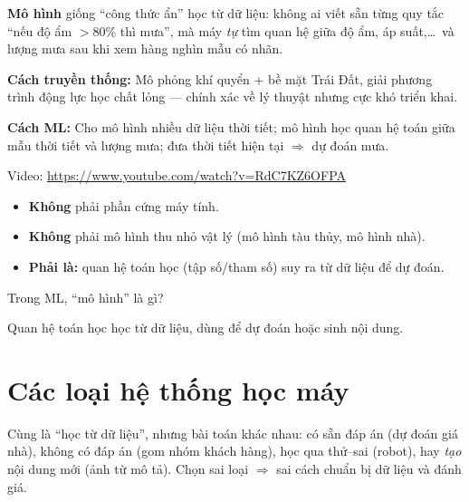 \documentclass[12pt,a4paper]{article}
\begin{document}
\begin{ynghia}
\textbf{Mô hình} giống ``công thức ẩn'' học từ dữ liệu: không ai viết sẵn từng quy tắc ``nếu độ ẩm $> 80\%$ thì mưa'', mà máy \emph{tự} tìm quan hệ giữa độ ẩm, áp suất,\ldots\ và lượng mưa sau khi xem hàng nghìn mẫu có nhãn.
\end{ynghia}

\begin{phuongphap}[title={Hai cách giải bài toán dự báo mưa}]
\textbf{Cách truyền thống:} Mô phỏng khí quyển + bề mặt Trái Đất, giải phương trình động lực học chất lỏng --- chính xác về lý thuyật nhưng cực khó triển khai.

\textbf{Cách ML:} Cho mô hình nhiều dữ liệu thời tiết; mô hình học quan hệ toán giữa mẫu thời tiết và lượng mưa; đưa thời tiết hiện tại $\Rightarrow$ dự đoán mưa.

\medskip
Video: \url{https://www.youtube.com/watch?v=RdC7KZ6OFPA}
\end{phuongphap}

\begin{phanvidu}[title={``Mô hình''}]
\begin{itemize}
  \item \textbf{Không} phải phần cứng máy tính.
  \item \textbf{Không} phải mô hình thu nhỏ vật lý (mô hình tàu thủy, mô hình nhà).
  \item \textbf{Phải là:} quan hệ toán học (tập số/tham số) suy ra từ dữ liệu để dự đoán.
\end{itemize}
\end{phanvidu}

\begin{luuy}
Trong ML, ``mô hình'' là gì?

\medskip
Quan hệ toán học học từ dữ liệu, dùng để dự đoán hoặc sinh nội dung.
\end{luuy}

\section{Các loại hệ thống học máy}

\begin{dongco}[title={Cần phân loại hệ thống ML}]
Cùng là ``học từ dữ liệu'', nhưng bài toán khác nhau: có sẵn đáp án (dự đoán giá nhà), không có đáp án (gom nhóm khách hàng), học qua thử--sai (robot), hay \emph{tạo} nội dung mới (ảnh từ mô tả). Chọn sai loại $\Rightarrow$ sai cách chuẩn bị dữ liệu và đánh giá.
\end{dongco}
\end{document}
